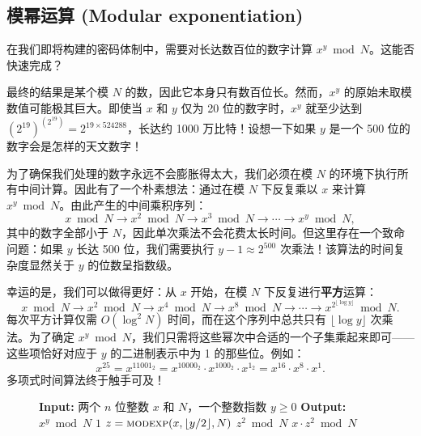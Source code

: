 \subsection{模幂运算 (Modular exponentiation)}
在我们即将构建的密码体制中，需要对长达数百位的数字计算 $x^y \bmod N$。这能否快速完成？

最终的结果是某个模 $N$ 的数，因此它本身只有数百位长。然而，$x^y$ 的原始未取模数值可能极其巨大。即使当 $x$ 和 $y$ 仅为 20 位的数字时，$x^y$ 就至少达到 $(2^{19})^{(2^{19})} = 2^{19 \times 524288}$，长达约 1000 万比特！设想一下如果 $y$ 是一个 500 位的数字会是怎样的天文数字！

为了确保我们处理的数字永远不会膨胀得太大，我们必须在模 $N$ 的环境下执行所有中间计算。因此有了一个朴素想法：通过在模 $N$ 下反复乘以 $x$ 来计算 $x^y \bmod N$。由此产生的中间乘积序列：
\[
x \bmod N \to x^2 \bmod N \to x^3 \bmod N \to \cdots \to x^y \bmod N,
\]
其中的数字全部小于 $N$，因此单次乘法不会花费太长时间。但这里存在一个致命问题：如果 $y$ 长达 500 位，我们需要执行 $y - 1 \approx 2^{500}$ 次乘法！该算法的时间复杂度显然关于 $y$ 的位数呈指数级。

幸运的是，我们可以做得更好：从 $x$ 开始，在模 $N$ 下反复进行\textbf{平方}运算：
\[
x \bmod N \to x^2 \bmod N \to x^4 \bmod N \to x^8 \bmod N \to \cdots \to x^{2^{\lfloor \log y \rfloor}} \bmod N.
\]
每次平方计算仅需 $O(\log^2 N)$ 时间，而在这个序列中总共只有 $\lfloor \log y \rfloor$ 次乘法。为了确定 $x^y \bmod N$，我们只需将这些幂次中合适的一个子集乘起来即可——这些项恰好对应于 $y$ 的二进制表示中为 1 的那些位。例如：
\[
x^{25} = x^{11001_2} = x^{10000_2} \cdot x^{1000_2} \cdot x^{1_2} = x^{16} \cdot x^8 \cdot x^1.
\]
多项式时间算法终于触手可及！

\begin{figure}[htbp]
\centering
\begin{tcolorbox}[colback=white,colframe=gray!50!black,title={\textbf{图 1.4}\quad 模幂运算 (Modular exponentiation)}]
\begin{algorithmic}[1]
    \State \textbf{Input:} 两个 $n$ 位整数 $x$ 和 $N$，一个整数指数 $y \ge 0$
    \State \textbf{Output:} $x^y \bmod N$
     \Return $1$ \EndIf
    \State $z = \Call{modexp}{x, \lfloor y/2 \rfloor, N}$
        \State \Return $z^2 \bmod N$
    \Else
        \State \Return $x \cdot z^2 \bmod N$
    \EndIf
\EndFunction
\end{algorithmic}
\end{tcolorbox}
\label{fig:modexp}
\end{figure}

